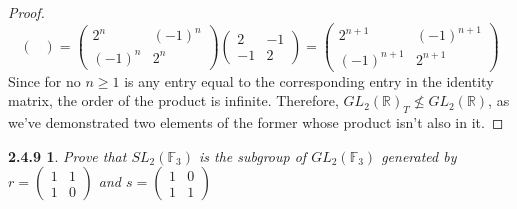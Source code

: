 \documentclass{article}
\newtheorem*{2.4.9}{2.4.9}
\begin{document}
\begin{proof}
\[\begin{pmatrix}
    \end{pmatrix}
    =
    \begin{pmatrix}
      2^n & (-1)^n \\
      (-1)^n & 2^n

    \end{pmatrix}
    \begin{pmatrix}
      2 & -1 \\
      -1 & 2

    \end{pmatrix}
    =
    \begin{pmatrix}
      2^{n+1} & (-1 )^{n+1}\\
      (-1)^{n+1} & 2^{n+1}

    \end{pmatrix}
  \]
  Since for no $n\geq 1$ is any entry equal to the corresponding entry in the identity matrix, the order of the product is infinite.
  Therefore, $GL_{2}(\mathbb{R})_{T}\not\leq GL_{2}(\mathbb{R})$, as we've demonstrated two elements of the former whose product isn't also in it.
\end{proof}

\begin{2.4.9}
  Prove that $SL_{2}(\mathbb{F}_{3})$ is the subgroup of $GL_{2}(\mathbb{F}_{3})$ generated by
  $r = \begin{pmatrix}
         1 & 1 \\
         1 & 0
       \end{pmatrix}$
   and\newline
   $s = \begin{pmatrix}
          1 & 0 \\
          1 & 1
        \end{pmatrix}$
\end{2.4.9}
\end{document}
